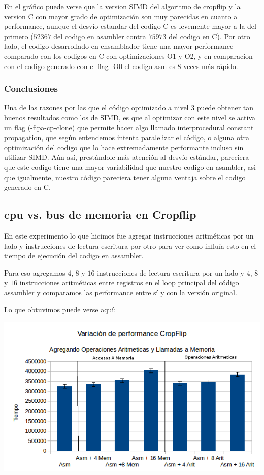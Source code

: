 \documentclass[a4paper]{article}
\begin{document}
En el gráfico puede verse que la version SIMD del algoritmo de cropflip  y la version C con mayor grado de optimización son muy parecidas en cuanto a performance, aunque el desvío estandar del codigo C es levemente mayor a la del primero ($52367$ del codigo en asambler contra $75973$ del codigo en C). Por otro lado, el codigo desarrollado en ensamblador tiene una mayor performance comparado con los codigos en C con optimizaciones O1 y O2, y en comparacion con el codigo generado con el flag -O0 el codigo asm es 8 veces más rápido.

\subsubsection{Conclusiones}
Una de las razones por las que el código optimizado a nivel 3 puede obtener tan buenos resultados como los de SIMD, es que al optimizar con este nivel se activa un flag (-fipa-cp-clone) que permite hacer algo llamado interprocedural constant propagation, que según entendemos intenta paralelizar el código, o alguna otra optimización del codigo que lo hace extremadamente performante incluso sin utilizar SIMD. Aún así, prestándole más atención al desvío estándar, pareciera que este codigo tiene una mayor variabilidad que nuestro codigo en asambler, asi que igualmente, nuestro código pareciera tener alguna ventaja sobre el codigo generado en C.

\newpage

\subsection{cpu vs. bus de memoria en Cropflip}

En este experimento lo que hicimos fue agregar instrucciones aritméticas por un lado y instrucciones de lectura-escritura por otro para ver como influía esto en el tiempo de ejecución del codigo en assambler.

Para eso agregamos $4$, $8$ y $16$ instrucciones de lectura-escritura por un lado y $4$, $8$ y $16$ instrucciones aritméticas entre registros en el loop principal del código assambler y comparamos las performance entre sí y con la versión original.

Lo que obtuvimos puede verse aquí:

  \begin{center}
  \includegraphics[scale=0.66]{Graficos1.5/crop/per.png}
  \end{center}
\end{document}
